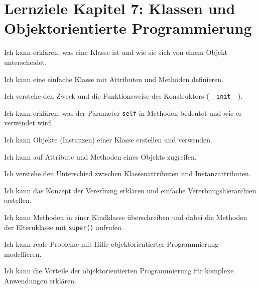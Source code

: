 \section*{Lernziele Kapitel 7: Klassen und Objektorientierte Programmierung}
\begin{todolist}
    \item Ich kann erklären, was eine Klasse ist und wie sie sich von einem Objekt unterscheidet.
    \item Ich kann eine einfache Klasse mit Attributen und Methoden definieren.
    \item Ich verstehe den Zweck und die Funktionsweise des Konstruktors (\lstinline|__init__|).
    \item Ich kann erklären, was der Parameter \lstinline|self| in Methoden bedeutet und wie er verwendet wird.
    \item Ich kann Objekte (Instanzen) einer Klasse erstellen und verwenden.
    \item Ich kann auf Attribute und Methoden eines Objekts zugreifen.
    \item Ich verstehe den Unterschied zwischen Klassenattributen und Instanzattributen.
    \item Ich kann das Konzept der Vererbung erklären und einfache Vererbungshierarchien erstellen.
    \item Ich kann Methoden in einer Kindklasse überschreiben und dabei die Methoden der Elternklasse mit \lstinline|super()| aufrufen.
    \item Ich kann reale Probleme mit Hilfe objektorientierter Programmierung modellieren.
    \item Ich kann die Vorteile der objektorientierten Programmierung für komplexe Anwendungen erklären.
\end{todolist}